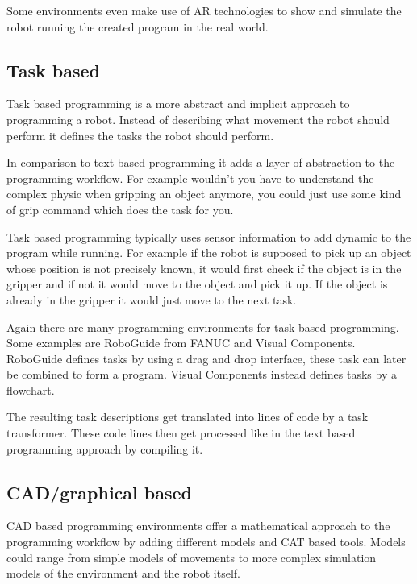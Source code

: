 \documentclass[conference]{IEEEtran}
\begin{document}
        Some environments even make use of AR technologies to show and simulate the robot running the created program in the real world.
        

    \subsection{Task based}

        Task based programming is a more abstract and implicit approach to programming a robot.
        Instead of describing what movement the robot should perform it defines the tasks the robot should perform.
       
        In comparison to text based programming it adds a layer of abstraction to the programming workflow. For example wouldn't you have to understand the complex physic when gripping an object anymore, you could just use some kind of grip command which does the task for you. %

        Task based programming typically uses sensor information to add dynamic to the program while running. For example if the robot is supposed to pick up an object whose position is not precisely known, it would first check if the object is in the gripper and if not it would move to the object and pick it up. If the object is already in the gripper it would just move to the next task.

        Again there are many programming environments for task based programming. Some examples are RoboGuide from FANUC and Visual Components. RoboGuide defines tasks by using a drag and drop interface, these task can later be combined to form a program.
        Visual Components instead defines tasks by a flowchart.

        The resulting task descriptions get translated into lines of code by a task transformer. These code lines then get processed like in the text based programming approach by compiling it. %
        

    \subsection{CAD/graphical based}

        CAD based programming environments offer a mathematical approach to the programming workflow by adding different models and CAT based tools.
        Models could range from simple models of movements to more complex simulation models of the environment and the robot itself. %
\end{document}
